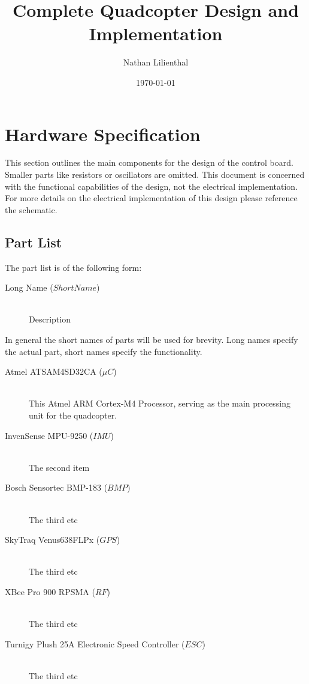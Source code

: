 \documentclass[titlepage]{article}
\title{Complete Quadcopter Design and Implementation}
\date{\today}
\author{Nathan Lilienthal}
\begin{document}
\maketitle

\tableofcontents
\clearpage

\section{Hardware Specification}

This section outlines the main components for the design of the control board.
Smaller parts like resistors or oscillators are omitted. This document is
concerned with the functional capabilities of the design, not the electrical
implementation. For more details on the electrical implementation of this design
please reference the schematic.

\subsection{Part List}

The part list is of the following form:

\begin{description}
  \item[Long Name ($Short Name$)]\hfill\\
  Description
\end{description}

In general the short names of parts will be used for brevity. Long names specify
the actual part, short names specify the functionality.

\begin{description}
  \item[Atmel ATSAM4SD32CA ($\mu C$)]\hfill\\
  This Atmel ARM Cortex-M4 Processor, serving as the main processing unit for the
  quadcopter.
  \item[InvenSense MPU-9250 ($IMU$)]\hfill\\
  The second item
  \item[Bosch Sensortec BMP-183 ($BMP$)]\hfill\\
  The third etc
  \item[SkyTraq Venus638FLPx ($GPS$)]\hfill\\
  The third etc
  \item[XBee Pro 900 RPSMA ($RF$)]\hfill\\
  The third etc
  \item[Turnigy Plush 25A Electronic Speed Controller ($ESC$)]\hfill\\
  The third etc
\end{description}
\end{document}
